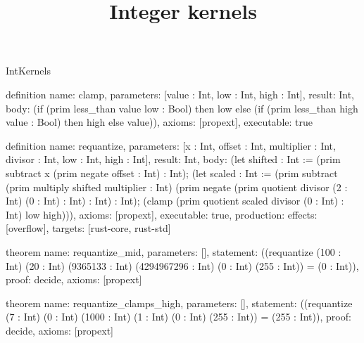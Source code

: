 \begin{lexlean}{IntKernels}
\title{Integer kernels}
\begin{semanticmodule}
definition{
  name: clamp,
  parameters: [value : Int, low : Int, high : Int],
  result: Int,
  body: (if (prim less_than value low : Bool) then low else (if (prim less_than high value : Bool) then high else value)),
  axioms: [propext],
  executable: true
}

definition{
  name: requantize,
  parameters: [x : Int, offset : Int, multiplier : Int, divisor : Int, low : Int, high : Int],
  result: Int,
  body: (let shifted : Int := (prim subtract x (prim negate offset : Int) : Int); (let scaled : Int := (prim subtract (prim multiply shifted multiplier : Int) (prim negate (prim quotient divisor (2 : Int) (0 : Int) : Int) : Int) : Int); (clamp (prim quotient scaled divisor (0 : Int) : Int) low high))),
  axioms: [propext],
  executable: true,
  production: {effects: [overflow], targets: [rust-core, rust-std]}
}

theorem{
  name: requantize_mid,
  parameters: [],
  statement: ((requantize (100 : Int) (20 : Int) (9365133 : Int) (4294967296 : Int) (0 : Int) (255 : Int)) = (0 : Int)),
  proof: decide{},
  axioms: [propext]
}

theorem{
  name: requantize_clamps_high,
  parameters: [],
  statement: ((requantize (7 : Int) (0 : Int) (1000 : Int) (1 : Int) (0 : Int) (255 : Int)) = (255 : Int)),
  proof: decide{},
  axioms: [propext]
}
\end{semanticmodule}
\end{lexlean}
